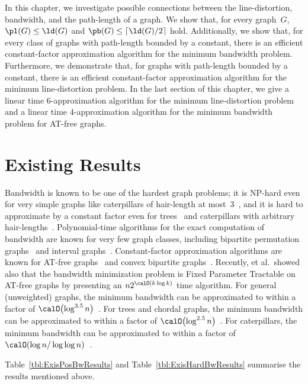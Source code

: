 In this chapter, we investigate possible connections between the line-distortion, bandwidth, and the path-length of a graph.
We show that, for every graph~$G$, $\pl(G) \leq \ld(G)$ and $\pb(G) \leq \lceil \ld(G) / 2 \rceil$ hold.
Additionally, we show that, for every class of graphs with path-length bounded by a constant, there is an efficient constant-factor approximation algorithm for the minimum bandwidth problem.
Furthermore, we demonstrate that, for graphs with path-length bounded by a constant, there is an efficient constant-factor approximation algorithm for the minimum line-distortion problem.
In the last section of this chapter, we give a linear time $6$-approximation algorithm for the minimum line-distortion problem and a linear time $4$-approximation algorithm for the minimum bandwidth problem for AT-free graphs.

\section{Existing Results}

Bandwidth is known to be one of the hardest graph problems; it is NP-hard even for very simple graphs like caterpillars of hair-length at most~$3$~\cite{Monien1986}, and it is hard to approximate by a constant factor even
for trees~\cite{BlacKarpWirt1998} and caterpillars with arbitrary hair-lengths~\cite{DubeyFeige2011}.
Polynomial-time algorithms for the exact computation of bandwidth are known for very few graph classes, including bipartite permutation graphs~\cite{HeggKratMeis2009} and interval graphs~\cite{KleitmVohra1990,KratscStewar2002,Sprague1994}.
Constant-factor approximation algorithms are known for AT-free graphs~\cite{KlokKratMuel1999} and convex bipartite graphs~\cite{ShreTayuUen2012}.
Recently,  et al.\,\cite{GolHegKraLok2011} showed also that the bandwidth minimization problem is Fixed Parameter Tractable on AT-free graphs by presenting an $n2^{\calO(k\log k)}$ time algorithm.
For general (unweighted) graphs, the minimum bandwidth can be approximated to within a factor of $\calO \! \left( \log^{3.5} n \right)$~\cite{Feige2000}.
For trees and chordal graphs, the minimum bandwidth can be approximated to within a factor of $\calO \! \left( \log^{2.5} n \right)$~\cite{Gupta2001}.
For caterpillars, the minimum bandwidth can be approximated to within a factor of $\calO(\log n / \log \log n)$~\cite{FeigeTalwar2009}.

Table~\ref{tbl:ExisPosBwResults} and Table~\ref{tbl:ExisHardBwResults} summarise the results mentioned above.

